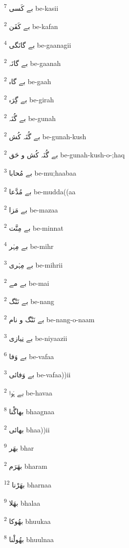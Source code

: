 \documentclass[12pt]{article}
\begin{document}
\begin{RTL}
\begin{multicols}{5}
{\ur بے کَسی}   \textsuperscript{7} be-kasii

{\ur بے کَفَن}   \textsuperscript{2} be-kafan

{\ur بے گانَگی}   \textsuperscript{4} be-gaanagii

{\ur بے گانَہ}   \textsuperscript{2} be-gaanah

{\ur بے گاہ}   \textsuperscript{2} be-gaah

{\ur بے گِرَہ}   \textsuperscript{2} be-girah

{\ur بے گُنَہ}   \textsuperscript{2} be-gunah

{\ur بے گُنَہ کُش}   \textsuperscript{2} be-gunah-kush

{\ur بے گُنَہ کُش و حَق}   \textsuperscript{2} be-gunah-kush-o-;haq

{\ur بے مُحابا}   \textsuperscript{3} be-mu;haabaa

{\ur بے مُدَّعا}   \textsuperscript{2} be-mudda((aa

{\ur بے مَزا}   \textsuperscript{2} be-mazaa

{\ur بے مِنَّت}   \textsuperscript{2} be-minnat

{\ur بے مِہْر}   \textsuperscript{4} be-mihr

{\ur بے مِہْری}   \textsuperscript{3} be-mihrii

{\ur بے مے}   \textsuperscript{2} be-mai

{\ur بے نَنْگ}   \textsuperscript{2} be-nang

{\ur بے نَنْگ و نام}   \textsuperscript{2} be-nang-o-naam

{\ur بے نِیازی}   \textsuperscript{3} be-niyaazii

{\ur بے وَفا}   \textsuperscript{6} be-vafaa

{\ur بے وَفائی}   \textsuperscript{3} be-vafaa))ii

{\ur بے ہَوا}   \textsuperscript{2} be-havaa

{\ur بھاگْنا}   \textsuperscript{8} bhaagnaa

{\ur بھائی}   \textsuperscript{2} bhaa))ii

{\ur بھَر}   \textsuperscript{9} bhar

{\ur بھَرَم}   \textsuperscript{2} bharam

{\ur بھَرْنا}   \textsuperscript{12} bharnaa

{\ur بھَلا}   \textsuperscript{9} bhalaa

{\ur بھُوکا}   \textsuperscript{2} bhuukaa

{\ur بھُولْنا}   \textsuperscript{8} bhuulnaa


\end{multicols}
\end{RTL}
\end{document}
